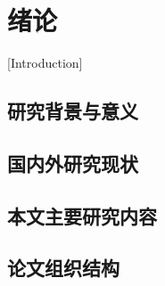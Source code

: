 
\chapter{绪论}[Introduction]


\section{研究背景与意义}

\section{国内外研究现状}

\section{本文主要研究内容}

\section{论文组织结构}
